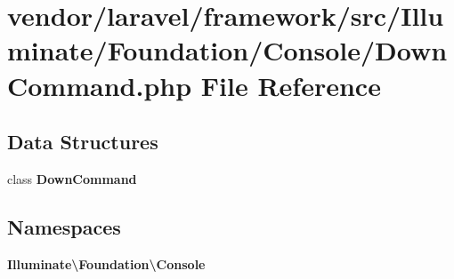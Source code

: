 \section{vendor/laravel/framework/src/\+Illuminate/\+Foundation/\+Console/\+Down\+Command.php File Reference}
\label{_down_command_8php}
\subsection*{Data Structures}
\begin{DoxyCompactItemize}
\item 
class {\bf Down\+Command}
\end{DoxyCompactItemize}
\subsection*{Namespaces}
\begin{DoxyCompactItemize}
\item 
 {\bf Illuminate\textbackslash{}\+Foundation\textbackslash{}\+Console}
\end{DoxyCompactItemize}
